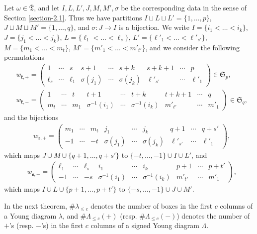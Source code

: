 \documentclass[ALCO,Unicode]{cedram}
\newcommand{\fk}{\mathfrak{k}}
\newcommand{\fs}{\mathfrak{s}}
\newcommand{\nrboxes}[2]{\# #1_{\leq #2}}
\newcommand{\nrplus}[2]{\# #1_{\leq #2}(+)}
\newcommand{\nrminus}[2]{\# #1_{\leq #2}(-)}
\newcommand{\permutationsof}[1]{\mathfrak{S}_{#1}}
\newcommand{\ppermutationsof}{\mathfrak{T}}
\newcommand{\parameters}{\overline{\ppermutationsof}}
\begin{document}
Let $\omega\in\parameters$, and let $I,L,L',J,M,M',\sigma$ be the corresponding data in the sense of Section \ref{section-2.1}. Thus we have partitions $I\sqcup L\sqcup L'=\{1,\ldots,p\}$, $J\sqcup M\sqcup M'=\{1,\ldots,q\}$, and $\sigma:J\to I$ is a bijection.
We write $I=\{i_1<\ldots<i_k\}$, $J=\{j_1<\ldots<j_k\}$,
$L=\{\ell_1<\ldots<\ell_s\}$, $L'=\{\ell'_1<\ldots<\ell'_{s'}\}$, $M=\{m_1<\ldots<m_t\}$, $M'=\{m'_1<\ldots<m'_{t'}\}$,
and we consider the following permutations
\begin{eqnarray}
\label{wk+} & w_{\fk,+}=\begin{pmatrix} 1 & \cdots & s & s+1 & \cdots & s+k & s+k+1 & \cdots & p\\
\ell_s & \cdots & \ell_1 & \sigma(j_1) & \cdots & \sigma(j_k) & \ell'_{s'} & \cdots & \ell'_1\end{pmatrix}\in\permutationsof{p},\\
\label{wk-} & w_{\fk,-}=\begin{pmatrix} 1 & \cdots & t & t+1 & \cdots & t+k & t+k+1 & \cdots & q\\
m_t & \cdots & m_1 & \sigma^{-1}(i_1) & \cdots & \sigma^{-1}(i_k) & m'_{t'} & \cdots & m'_1\end{pmatrix}\in\permutationsof{q},
\end{eqnarray}
and the bijections
\begin{eqnarray}
\label{ws+} & w_{\fs,+} = \begin{pmatrix} m_1 & \cdots & m_t & j_1 & \cdots & j_k & q+1 & \cdots & q+s'\\
-1 & \cdots & -t & \sigma(j_1) & \cdots & \sigma(j_k) & \ell'_{s'} & \cdots & \ell'_1 \end{pmatrix},
\end{eqnarray}
which maps $J\cup M\cup\{q+1,\ldots,q+s'\}$ to $\{-t,\ldots,-1\}\cup I\cup L'$, and
\begin{eqnarray}
\label{ws-} & w_{\fs,-} = \begin{pmatrix} \ell_1 & \cdots & \ell_s & i_1 & \cdots & i_k & p+1 & \cdots & p+t'\\
-1 & \cdots & -s & \sigma^{-1}(i_1) & \cdots & \sigma^{-1}(i_k) & m'_{t'} & \cdots & m'_1 \end{pmatrix},
\end{eqnarray}
which maps $I\cup L\cup\{p+1,\ldots,p+t'\}$ to $\{-s,\ldots,-1\}\cup J\cup M'$.

In the next theorem,
 $\nrboxes{\lambda}{c}$ denotes the number of boxes in the first $c$ columns of a Young diagram $\lambda$, and $\nrplus{\Lambda}{c}$ (resp. $\nrminus{\Lambda}{c}$) denotes the number of $+$'s (resp. $-$'s) in the first $c$ columns of a signed Young diagram $\Lambda$.
\end{document}
